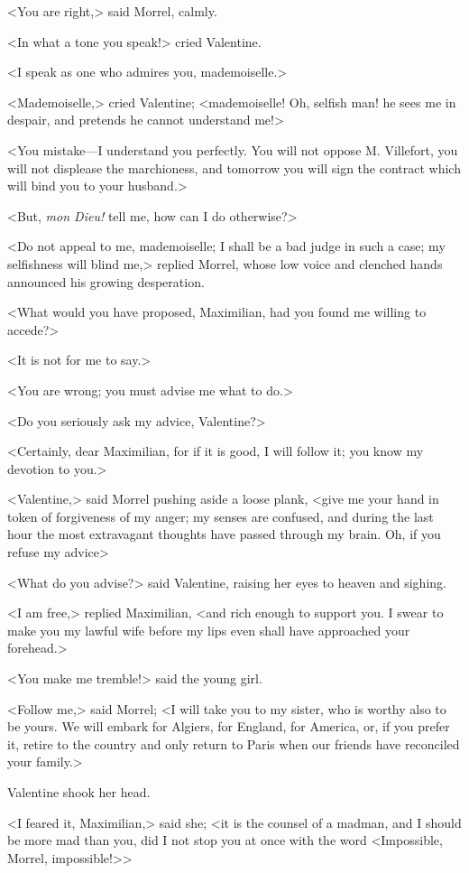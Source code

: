  <You are right,> said Morrel, calmly. 

 <In what a tone you speak!> cried Valentine. 

 <I speak as one who admires you, mademoiselle.> 

 <Mademoiselle,> cried Valentine; <mademoiselle! Oh, selfish man! he sees me in despair, and pretends he cannot understand me!> 

 <You mistake—I understand you perfectly. You will not oppose M. Villefort, you will not displease the marchioness, and tomorrow you will sign the contract which will bind you to your husband.> 

 <But, \textit{mon Dieu!} tell me, how can I do otherwise?> 

 <Do not appeal to me, mademoiselle; I shall be a bad judge in such a case; my selfishness will blind me,> replied Morrel, whose low voice and clenched hands announced his growing desperation. 

 <What would you have proposed, Maximilian, had you found me willing to accede?> 

 <It is not for me to say.> 

 <You are wrong; you must advise me what to do.> 

 <Do you seriously ask my advice, Valentine?> 

 <Certainly, dear Maximilian, for if it is good, I will follow it; you know my devotion to you.> 

 <Valentine,> said Morrel pushing aside a loose plank, <give me your hand in token of forgiveness of my anger; my senses are confused, and during the last hour the most extravagant thoughts have passed through my brain. Oh, if you refuse my advice\longdash> 

 <What do you advise?> said Valentine, raising her eyes to heaven and sighing. 

 <I am free,> replied Maximilian, <and rich enough to support you. I swear to make you my lawful wife before my lips even shall have approached your forehead.> 

 <You make me tremble!> said the young girl. 

 <Follow me,> said Morrel; <I will take you to my sister, who is worthy also to be yours. We will embark for Algiers, for England, for America, or, if you prefer it, retire to the country and only return to Paris when our friends have reconciled your family.> 

 Valentine shook her head. 

 <I feared it, Maximilian,> said she; <it is the counsel of a madman, and I should be more mad than you, did I not stop you at once with the word <Impossible, Morrel, impossible!>> 

